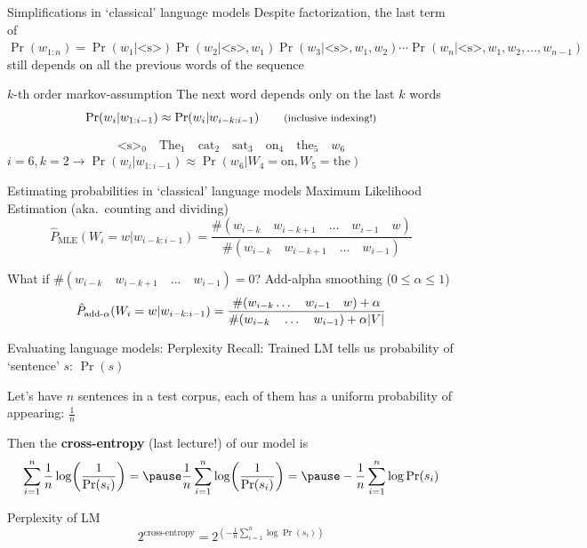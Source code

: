 \documentclass[12pt,aspectratio=169,handout]{beamer}
\begin{document}
\begin{frame}{Simplifications in `classical' language models}
	Despite factorization, the last term of
	$
\Pr(w_{1:n}) = \Pr(w_1 | \text{<s>}) \Pr (w_2 | \text{<s>}, w_1) \Pr(w_3 | \text{<s>}, w_1, w_2) \cdots \Pr(w_n | \text{<s>}, w_1, w_2, \ldots, w_{n-1})
	$
	still depends on all the previous words of the sequence
	
	\begin{block}{$k$-th order markov-assumption}
		The next word depends only on the last $k$ words
		$$
		\Pr(w_{i} | w_{1:i-1}) \approx \Pr (w_{i} | w_{i-k:i-1}) \qquad \text{\footnotesize{(inclusive indexing!)}}
		$$
	\end{block}
	\pause
	$$
	\text{<s>}_0 \quad \text{The}_1 \quad \text{cat}_2 \quad \text{sat}_3 \quad \text{on}_4 \quad \text{the}_5 \quad w_6
	$$
	$i = 6, k=2 \to \Pr(w_{i} | w_{1:i-1}) \approx \Pr(w_6 | W_4 = \text{on}, W_5 = \text{the})$
\end{frame}

\begin{frame}{Estimating probabilities in `classical' language models}
	Maximum Likelihood Estimation (aka.\ counting and dividing)
	$$
	\hat{P}_{\text{MLE}}(W_i = w | w_{i - k:i - 1}) = \frac{\#(w_{i-k} \quad w_{i-k+1} \quad \ldots \quad w_{i-1} \quad w)}{\#(w_{i-k} \quad w_{i-k+1} \quad \ldots \quad w_{i-1})}
	$$
	\begin{block}{What if $\#(w_{i-k} \quad w_{i-k+1} \quad \ldots \quad w_{i-1}) = 0$?}
\pause
		Add-alpha smoothing ($0 \leq \alpha \leq 1$)
		$$
		\hat{P}_{\text{add-}\alpha}(W_i = w | w_{i - k:i - 1}) =
		\frac{\#(w_{i-k} \ldots \quad w_{i-1} \quad w) + \alpha}
		{\#(w_{i-k} \quad \ldots \quad w_{i-1}) + \alpha \abs{V}}
		$$
	\end{block}
	
\end{frame}


\begin{frame}{Evaluating language models: Perplexity}
	Recall: Trained LM tells us probability of `sentence' $s$: $\Pr(s)$
	
	\pause
	Let's have $n$ sentences in a test corpus, each of them has a uniform probability of appearing: $\frac{1}{n}$
	
	\pause
	Then the \textbf{cross-entropy} (last lecture!) of our model is
	$$
	\sum_{i = 1}^{n} \frac{1}{n} \log (\frac{1}{\Pr(s_i)}) = \pause
	\frac{1}{n} \sum_{i = 1}^{n} \log (\frac{1}{\Pr(s_i)}) = \pause
	- \frac{1}{n} \sum_{i = 1}^{n} \log \Pr(s_i)
	$$
	\pause \begin{block}{Perplexity of LM}
		$$
		2^{\text{cross-entropy}} = 
		2^{\left(- \frac{1}{n} \sum_{i = 1}^{n} \log \Pr(s_i)\right)}
		$$
	\end{block}
	
\end{frame}
\end{document}
